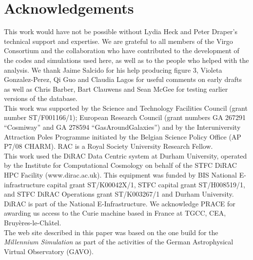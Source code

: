 \section*{Acknowledgements}
This work would have not be possible without Lydia Heck and Peter Draper's
technical support and expertise. We are grateful to all members of the Virgo
Consortium and the \eagle collaboration who have contributed to the development
of the codes and simulations used here, as well as to the people who helped with
the analysis. We thank Jaime Salcido for his help producing figure 3, Violeta
Gonzalez-Perez, Qi Guo and Claudia Lagos for useful comments on early drafts as
well as Chris Barber, Bart Clauwens and Sean McGee for testing earlier versions
of the \eagle database.  \\ This work was supported by the Science and
Technology Facilities Council (grant number ST/F001166/1); European Research
Council (grant numbers GA 267291 ``Cosmiway'' and GA 278594
``GasAroundGalaxies'') and by the Interuniversity Attraction Poles Programme
initiated by the Belgian Science Policy Office (AP P7/08 CHARM). RAC is a Royal
Society University Research Fellow.\\ This work used the DiRAC Data Centric
system at Durham University, operated by the Institute for Computational
Cosmology on behalf of the STFC DiRAC HPC Facility (www.dirac.ac.uk). This
equipment was funded by BIS National E-infrastructure capital grant
ST/K00042X/1, STFC capital grant ST/H008519/1, and STFC DiRAC Operations grant
ST/K003267/1 and Durham University. DiRAC is part of the National
E-Infrastructure.  We acknowledge PRACE for awarding us access to the Curie
machine based in France at TGCC, CEA, Bruy\`eres-le-Ch\^atel. \\ The web site
described in this paper was based on the one build for the \emph{Millennium
  Simulation} as part of the activities of the German Astrophysical Virtual
Observatory (GAVO).

